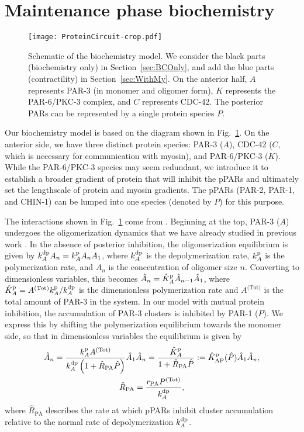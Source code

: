 \documentclass[11pt]{article}
\newcommand{\6}[1]{#1_{\text{6}}}
\newcommand{\3}[1]{#1_{\text{3}}}
\newcommand{\Tot}[1]{#1^\text{(Tot)}}
\begin{document}
\section{Maintenance phase biochemistry \label{sec:BCOnly}}
\begin{figure}
\centering
\texttt{[image: ProteinCircuit-crop.pdf]}
\caption{\label{fig:ModelSch}Schematic of the biochemistry model. We consider the black parts (biochemistry only) in Section\ \ref{sec:BCOnly}, and add the blue parts (contractility) in Section\ \ref{sec:WithMy}. On the anterior half, $A$ represents PAR-3 (in monomer and oligomer form), $K$ represents the PAR-6/PKC-3 complex, and $C$ represents CDC-42. The posterior PARs can be represented by a single protein species $P$.}
\end{figure}

Our biochemistry model is based on the diagram shown in Fig.\ \ref{fig:ModelSch}. On the anterior side, we have three distinct protein species: PAR-3 ($A$), CDC-42 ($C$, which is necessary for communication with myosin), and PAR-6/PKC-3 ($K$). While the PAR-6/PKC-3 species may seem redundant, we introduce it to establish a broader gradient of protein that will inhibit the pPARs and ultimately set the lengthscale of protein and myosin gradients. The pPARs (PAR-2, PAR-1, and CHIN-1) can be lumped into one species (denoted by $P$) for this purpose. 

The interactions shown in Fig.\ \ref{fig:ModelSch} come from \cite[Fig.~2]{lang2017proteins}. Beginning at the top, PAR-3 ($A$) undergoes the oligomerization dynamics that we have already studied in previous work \cite{lang2023oligomerization}. In the absence of posterior inhibition, the oligomerization equilibrium is given by $k^\text{dp}_A A_n = k^\text{p}_A A_n A_1$, where $k^\text{dp}_A$ is the depolymerization rate, $k^\text{p}_A$ is the polymerization rate, and $A_n$ is the concentration of oligomer size $n$. Converting to dimensionless variables, this becomes $\hat A_n = \hat{K}^\text{p}_A \hat A_{n-1} \hat A_1$, where $\KhatpA=\Tot{A} \kp_A/\kdp_A$ is the dimensionless polymerization rate and $\Tot{A}$ is the total amount of PAR-3 in the system. In our model with mutual protein inhibition, the accumulation of PAR-3 clusters is inhibited by PAR-1 ($P$). We express this by shifting the polymerization equilibrium towards the monomer side, so that in dimensionless variables the equilibrium is given by 
\begin{subequations}
\begin{gather}
\label{eq:QSSP}
\hat A_n = \frac{\kp_A \Tot{A}}{\kdp_A\left(1+\hat R_\text{PA} \hat P\right)} \hat A_1 \hat A_n =\frac{\KhatpA}{1+\hat R_\text{PA} \hat P}:=\KhatpAP (\hat P )\hat A_1 \hat A_n,\\
\hat R_\text{PA} = \frac{r_\text{PA}\Tot{P}}{\kdp_A},
\end{gather}
\end{subequations}
where $\hat R_\text{PA}$ describes the rate at which pPARs inhibit cluster accumulation relative to the normal rate of depolymerization $k^\text{dp}_A$. 
\end{document}
